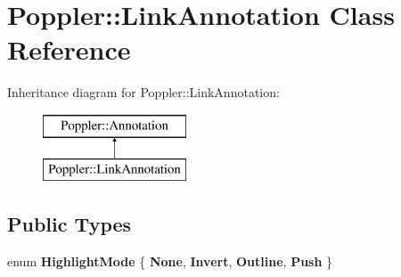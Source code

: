 \hypertarget{class_poppler_1_1_link_annotation}{}\section{Poppler\+:\+:Link\+Annotation Class Reference}
\label{class_poppler_1_1_link_annotation}
Inheritance diagram for Poppler\+:\+:Link\+Annotation\+:\begin{figure}[H]
\begin{center}
\leavevmode
\includegraphics[height=2.000000cm]{class_poppler_1_1_link_annotation}
\end{center}
\end{figure}
\subsection*{Public Types}
\begin{DoxyCompactItemize}
\item 
\mbox{\label{class_poppler_1_1_link_annotation_af031c0413e4773c0d01dd52b6b2c611b}} 
enum {\bfseries Highlight\+Mode} \{ {\bfseries None}, 
{\bfseries Invert}, 
{\bfseries Outline}, 
{\bfseries Push}
 \}
\end{DoxyCompactItemize}
